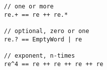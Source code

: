 \begin{lstlisting}[style=scalaioScala]
// one or more
re.+ == re ++ re.*

// optional, zero or one
re.? == EmptyWord | re

// exponent, n-times
re^4 == re ++ re ++ re ++ re
\end{lstlisting}
